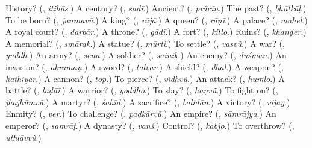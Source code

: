 \begin{tcolorbox}[breakable,colback=teal!4,colframe=teal!35!black,title={Before you move on}]
History? (\textbf{}, \emph{itihās}.) A century? (\textbf{}, \emph{sadī}.) Ancient? (\textbf{}, \emph{prācīn}.) The past? (\textbf{}, \emph{bhūtkāḷ}.) To be born? (\textbf{}, \emph{janmavũ}.) A king? (\textbf{}, \emph{rājā}.) A queen? (\textbf{}, \emph{rāṇī}.) A palace? (\textbf{}, \emph{mahel}.) A royal court? (\textbf{}, \emph{darbār}.) A throne? (\textbf{}, \emph{gādī}.) A fort? (\textbf{}, \emph{killo}.) Ruins? (\textbf{}, \emph{khanḍer}.) A memorial? (\textbf{}, \emph{smārak}.) A statue? (\textbf{}, \emph{mūrti}.) To settle? (\textbf{}, \emph{vasvũ}.) A war? (\textbf{}, \emph{yuddh}.) An army? (\textbf{}, \emph{senā}.) A soldier? (\textbf{}, \emph{sainik}.) An enemy? (\textbf{}, \emph{duśman}.) An invasion? (\textbf{}, \emph{ākramaṇ}.) A sword? (\textbf{}, \emph{talvār}.) A shield? (\textbf{}, \emph{ḍhāl}.) A weapon? (\textbf{}, \emph{hathiyār}.) A cannon? (\textbf{}, \emph{top}.) To pierce? (\textbf{}, \emph{vī̃dhvũ}.) An attack? (\textbf{}, \emph{humlo}.) A battle? (\textbf{}, \emph{laḍāī}.) A warrior? (\textbf{}, \emph{yoddho}.) To slay? (\textbf{}, \emph{haṇvũ}.) To fight on? (\textbf{}, \emph{jhajhūmvũ}.) A martyr? (\textbf{}, \emph{śahīd}.) A sacrifice? (\textbf{}, \emph{balidān}.) A victory? (\textbf{}, \emph{vijay}.) Enmity? (\textbf{}, \emph{ver}.) To challenge? (\textbf{}, \emph{paḍkārvũ}.) An empire? (\textbf{}, \emph{sāmrājya}.) An emperor? (\textbf{}, \emph{samrāṭ}.) A dynasty? (\textbf{}, \emph{vanś}.) Control? (\textbf{}, \emph{kabjo}.) To overthrow? (\textbf{}, \emph{uthlāvvũ}.)
\end{tcolorbox}
